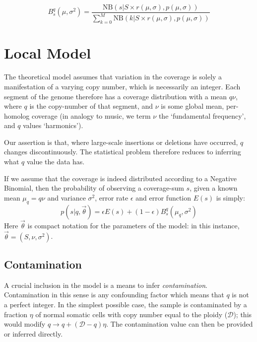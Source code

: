 \documentclass[fleqn,usenatbib]{mnras}
\begin{document}
{						\begin{equation}
							B_s^q (\mu,\sigma^2) = \frac{\text{NB}(s | S\times r(\mu,\sigma), p(\mu,\sigma))}{\sum_{k=0}^M \text{NB}(k| S\times r(\mu,\sigma), p(\mu,\sigma))} \label{E:HarmonicNormalise}
						\end{equation}

					
			\section{Local Model}\label{A:Model}
				
				The theoretical model assumes that variation in the coverage is solely a manifestation of a varying copy number, which is necessarily an integer. Each segment of the genome therefore has a coverage distribution with a mean $q \nu$, where $q$ is the copy-number of that segment, and $\nu$ is some global mean, per-homolog coverage (in analogy to music, we term $\nu$ the `fundamental frequency', and $q$ values `harmonics').
				
				Our assertion is that, where large-scale insertions or deletions have occurred, $q$ changes discontinuously. The statistical problem therefore reduces to inferring what $q$ value the data has. 
				
				If we assume that the coverage is indeed distributed according to a Negative Binomial, then the probability of observing a coverage-sum $s$, given a known mean $\mu_q = q\nu$ and variance $\sigma^2$, error rate $\epsilon$ and error function $E(s)$ is simply:
				\begin{equation}
					p(s | q, \vec{\theta}) = \epsilon E(s) + (1 - \epsilon) B_s^q (\mu_q, \sigma^2) \label{E:MixtureModel}
				\end{equation} 
				Here $\vec{\theta}$ is compact notation for the parameters of the model: in this instance, $\vec{\theta} = (S,\nu,\sigma^2)$.
				\subsection{Contamination}

					A crucial inclusion in the model is a means to infer \textit{contamination}. Contamination in this sense is any confounding factor which means that $q$ is not a perfect integer. In the simplest possible case, the sample is contaminated by a fraction $\eta$ of normal somatic cells with copy number equal to the ploidy ($\mathcal{D}$); this would modify $q \to q + (\mathcal{D} - q) \eta$. The contamination value can then be provided or inferred directly.

}
\end{document}
